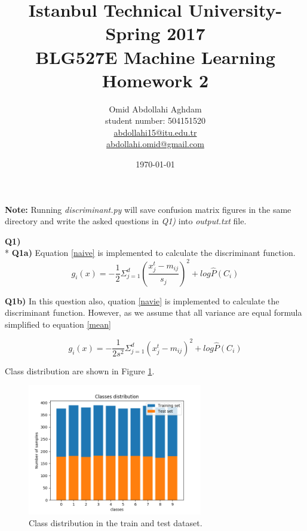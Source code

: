 \documentclass[12pt]{article}
\begin{document}
\title{Istanbul Technical University- Spring 2017 \\ BLG527E Machine Learning \\ Homework 2}
\author{Omid Abdollahi Aghdam \\
student number: 504151520\\
\href{mailto:abdollahi15@itu.edu.tr}{abdollahi15@itu.edu.tr}\\
\href{mailto:abdollahi.omid@gmail.com}{abdollahi.omid@gmail.com}
}
\date{\today}
\maketitle
\newpage

\textbf{Note:} Running \textit{discriminant.py} will save confusion matrix figures in the same directory and write the asked questions in \textit{Q1)} into \textit{output.txt} file.

\textbf{Q1)}\\*
\textbf{Q1a)} Equation \ref{naive} is implemented to calculate the discriminant function.  
\begin{equation}\label{naive}
	g_{i}(x) = -\frac{1}{2}\Sigma_{j=1}^{d} (\frac{x_{j}^{t} - m_{ij}}{s_{j}})^{2} + log\hat{P}(C_{i})
\end{equation}

\textbf{Q1b)} In this question also, quation \ref{navie} is implemented to calculate the discriminant function. However, as we assume that all variance are equal formula simplified to equation \ref{mean}   

\begin{equation}\label{mean}
	g_{i}(x) = -\frac{1}{2s^{2}}\Sigma_{j=1}^{d} (x_{j}^{t} - m_{ij})^{2} + log\hat{P}(C_{i})	
\end{equation}

Class distribution are shown in Figure \ref{fig:dist}.
\begin{figure}[ht]
	\centerline{\includegraphics[width=3in]{dist.png}}
	\caption{Class distribution in the train and test dataset.}
	\label{fig:dist}
\end{figure}
\end{document}
